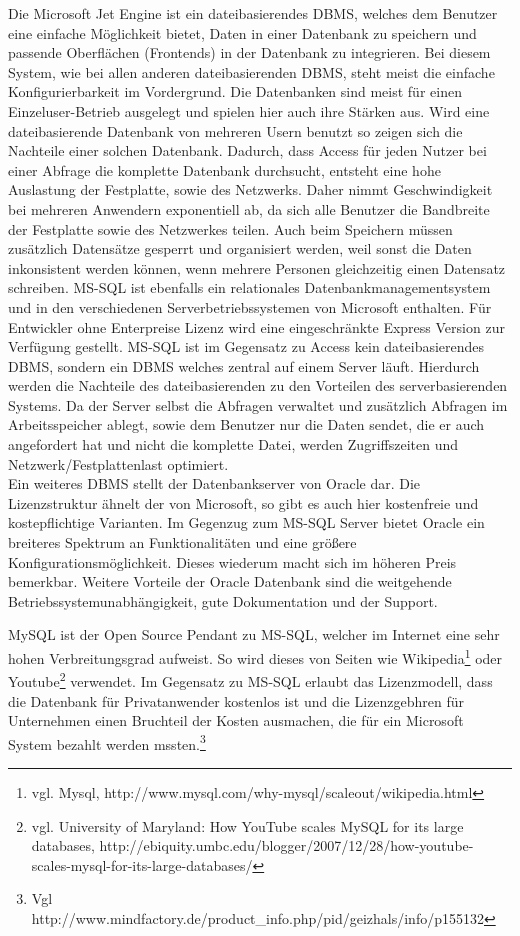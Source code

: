 Die Microsoft Jet Engine ist ein dateibasierendes DBMS, welches dem Benutzer eine einfache Möglichkeit bietet, Daten in einer Datenbank zu speichern und passende Oberflächen (Frontends) in der Datenbank zu integrieren.
Bei diesem System, wie bei allen anderen dateibasierenden DBMS, steht meist die einfache Konfigurierbarkeit im Vordergrund. Die Datenbanken sind meist für einen Einzeluser-Betrieb ausgelegt und spielen hier auch ihre Stärken aus.
Wird eine dateibasierende Datenbank von mehreren Usern benutzt so zeigen sich die Nachteile einer solchen Datenbank.
Dadurch, dass Access für jeden Nutzer bei einer Abfrage die komplette Datenbank durchsucht, entsteht eine hohe Auslastung der Festplatte, sowie des Netzwerks. Daher nimmt Geschwindigkeit bei mehreren Anwendern exponentiell ab, da sich alle Benutzer die Bandbreite der Festplatte sowie des Netzwerkes teilen.
Auch beim Speichern müssen zusätzlich Datensätze gesperrt und organisiert werden, weil sonst die Daten inkonsistent werden können, wenn mehrere Personen gleichzeitig einen Datensatz schreiben.
MS-SQL ist ebenfalls ein relationales Datenbankmanagementsystem
und in den verschiedenen Serverbetriebssystemen von Microsoft enthalten. Für Entwickler
ohne Enterpreise Lizenz wird eine eingeschränkte Express Version zur Verfügung gestellt. MS-SQL ist im Gegensatz zu Access kein dateibasierendes DBMS, sondern ein DBMS welches
zentral auf einem Server läuft. Hierdurch werden die Nachteile des dateibasierenden zu
den Vorteilen des serverbasierenden Systems. Da der Server selbst die Abfragen verwaltet
und zusätzlich Abfragen im Arbeitsspeicher ablegt, sowie dem Benutzer nur die Daten
sendet, die er auch angefordert hat und nicht die komplette Datei, werden Zugriffszeiten
und Netzwerk/Festplattenlast optimiert.\\
Ein weiteres DBMS stellt der Datenbankserver von Oracle dar. Die Lizenzstruktur ähnelt der von Microsoft, so gibt es auch hier kostenfreie und kostepflichtige Varianten. Im Gegenzug zum MS-SQL Server bietet Oracle ein breiteres Spektrum an Funktionalitäten und eine größere Konfigurationsmöglichkeit. Dieses wiederum macht sich im höheren Preis bemerkbar. Weitere Vorteile der Oracle Datenbank sind die weitgehende Betriebssystemunabhängigkeit, gute Dokumentation und der Support.

MySQL ist der Open Source Pendant zu MS-SQL, welcher im Internet eine sehr hohen Verbreitungsgrad aufweist.
So wird dieses von Seiten wie Wikipedia\footnote{vgl. Mysql, http://www.mysql.com/why-mysql/scaleout/wikipedia.html} oder
Youtube\footnote{vgl. University of Maryland: How YouTube scales MySQL for its large databases, http://ebiquity.umbc.edu/blogger/2007/12/28/how-youtube-scales-mysql-for-its-large-databases/} verwendet.
Im Gegensatz zu MS-SQL erlaubt das Lizenzmodell, dass die Datenbank für Privatanwender kostenlos ist und die Lizenzgebhren für Unternehmen einen Bruchteil der Kosten ausmachen, die für ein Microsoft System bezahlt werden mssten.\footnote{Vgl http://www.mindfactory.de/product\_info.php/pid/geizhals/info/p155132}

